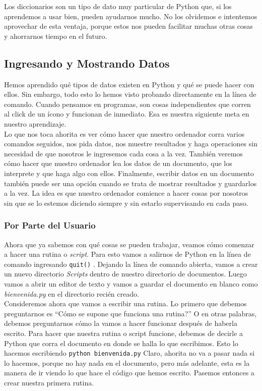 \documentclass[10pt,letterpaper]{article}
\newcommand{\inlinecode}[1]{
\colorbox{light-gray}{\texttt{#1}}
}
\begin{document}
Los diccionarios son un tipo de dato muy particular de Python que, si los aprendemos a usar bien, pueden ayudarnos mucho. No los olvidemos e intentemos aprovechar de esta ventaja, porque estos nos pueden facilitar muchas otras cosas y ahorrarnos tiempo en el futuro.

\subsection{Ingresando y Mostrando Datos}
Hemos aprendido qu\'e tipos de datos existen en Python y qu\'e se puede hacer con ellos. Sin embargo, todo esto lo hemos visto probando directamente en la l\'inea de comando. Cuando pensamos en programas, son cosas independientes que corren al click de un \'icono y funcionan de inmediato. Esa es nuestra siguiente meta en nuestro aprendizaje.\\

Lo que nos toca ahorita es ver c\'omo hacer que nuestro ordenador corra varios comandos seguidos, nos pida datos, nos muestre resultados y haga operaciones sin necesidad de que nosotros le ingresemos cada cosa a la vez. Tambi\'en veremos c\'omo hacer que nuestro ordenador lea los datos de un documento, que los interprete y que haga algo con ellos. Finalmente, escribir datos en un documento tambi\'en puede ser una opci\'on cuando se trata de mostrar resultados y guardarlos a la vez. La idea es que nuestro ordenador comience a hacer cosas por nosotros sin que se lo estemos diciendo siempre y sin estarlo supervisando en cada paso.

\subsubsection{Por Parte del Usuario}
Ahora que ya sabemos con qu\'e cosas se pueden trabajar, veamos c\'omo comenzar a hacer una rutina o \textit{script}. Para esto vamos a salirnos de Python en la l\'inea de comando ingresando \inlinecode{quit()}. Dejando la l\'inea de comando abierta, vamos a crear un nuevo directorio \textit{Scripts} dentro de nuestro directorio de documentos. Luego vamos a abrir un editor de texto y vamos a guardar el documento en blanco como \textit{bienvenida.py} en el directorio reci\'en creado.\\

Consideremos ahora que vamos a escribir una rutina. Lo primero que debemos preguntarnos es ``C\'omo se supone que funciona una rutina?'' O en otras palabras, debemos preguntarnos c\'omo la vamos a hacer funcionar despu\'es de haberla escrito. Para hacer que nuestra rutina o script funcione, debemos de decirle a Python que corra el documento en donde se halla lo que escribimos. Esto lo hacemos escribiendo \inlinecode{python bienvenida.py} Claro, ahorita no va a pasar nada si lo hacemos, porque no hay nada en el documento, pero m\'as adelante, esta es la manera de ir viendo lo que hace el c\'odigo que hemos escrito. Pasemos entonces a crear nuestra primera rutina.\\
\end{document}
